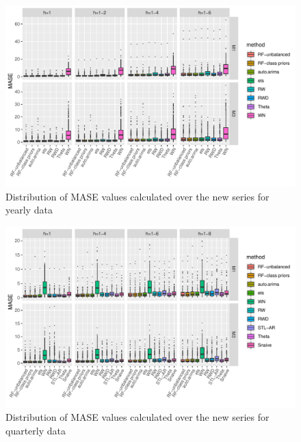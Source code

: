 \documentclass[11pt,a4paper,]{article}
\begin{document}
\begin{figure}[H]

{\centering \includegraphics[width=\textwidth]{figure/yearlybox-1} 

}

\caption{Distribution of MASE values calculated over the new series for yearly data}\label{fig:yearlybox}
\end{figure}

\begin{figure}[H]

{\centering \includegraphics[width=\textwidth]{figure/quarterlybox-1} 

}

\caption{Distribution of MASE values calculated over the new series for quarterly data}\label{fig:quarterlybox}
\end{figure}
\end{document}
